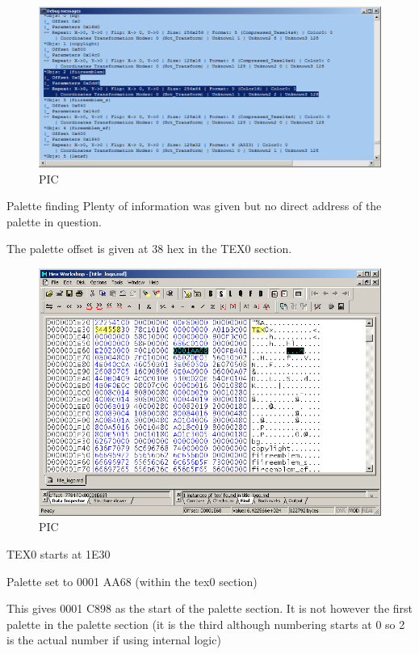 \documentclass[
]{book}
\begin{document}
\begin{figure}
\centering
\includegraphics{images/73_home_fast6191_romhackingguide_unrenamed_file___gguidegraphics3dminorNSMBDtexturedecoding_5.png}
\caption{PIC}
\end{figure}

Palette finding Plenty of information was given but no direct address of the palette in question.

The palette offset is given at 38 hex in the TEX0 section.

\begin{figure}
\centering
\includegraphics{images/74_home_fast6191_romhackingguide_unrenamed_file___gguidegraphics3dminorNSMBDtexturedecoding_7.png}
\caption{PIC}
\end{figure}

TEX0 starts at 1E30

Palette set to 0001 AA68 (within the tex0 section)

This gives 0001 C898 as the start of the palette section. It is not however the first palette in the palette section (it is the third although numbering starts at 0 so 2 is the actual number if using internal logic)
\end{document}
